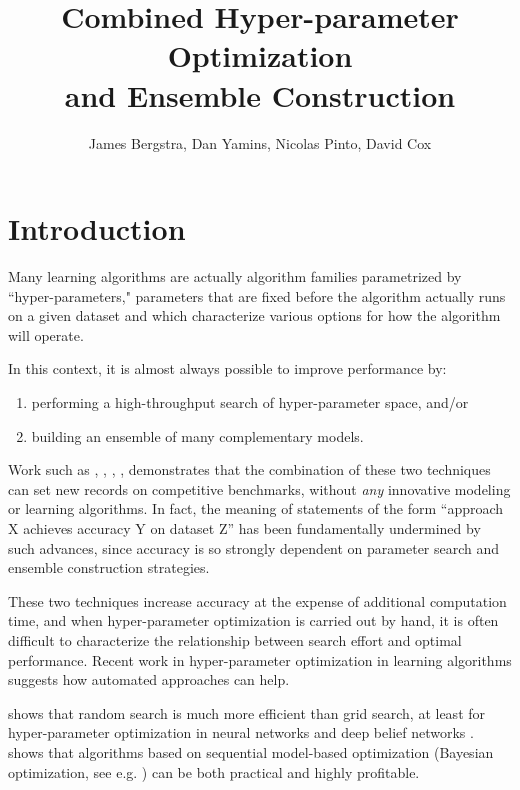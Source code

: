 \documentclass[11pt,twocolumn]{article}
\title{Combined Hyper-parameter Optimization\\and Ensemble Construction}
\author{James Bergstra, Dan Yamins, Nicolas Pinto, David Cox}
\begin{document}
\maketitle


\section{Introduction}

Many learning algorithms are actually algorithm families parametrized by 
``hyper-parameters,"  parameters that are fixed before the algorithm 
actually runs on a given dataset and which characterize various options for how
the algorithm will operate.

\vspace{11pt}
In this context, it is almost always possible to improve performance 
by:
\begin{enumerate}
 \item performing a high-throughput search of hyper-parameter space, and/or
 \item building an ensemble of many complementary models.
\end{enumerate}

\vspace{11pt}
Work such as
\cite{Pinto-2009}, \cite{pinto+cox:2011}, \cite{coates+lee+ng:2011},
\cite{gehler+nowozin:2009}, \cite{bergstra+bardenet+bengio+kegl:2011}
demonstrates that the combination of these two techniques can set new
records on competitive benchmarks, without \emph{any} innovative modeling or
learning algorithms.  In fact, the meaning of statements of the form
``approach X achieves accuracy Y on dataset Z'' has been fundamentally undermined by such
advances, since accuracy is so strongly dependent on parameter search and
ensemble construction strategies.

\vspace{11pt}
These two techniques increase accuracy at the expense of 
additional computation time, and when hyper-parameter 
optimization is carried out by hand, it is often
difficult to characterize the relationship between search 
effort and optimal performance.  Recent work in hyper-parameter
optimization in learning algorithms suggests how automated approaches
can help.

\vspace{11pt}
\cite{bergstra+bengio:2012} shows that random search is much more
efficient than grid search, at least for hyper-parameter optimization in
neural networks and deep belief networks
\cite{hinton+osindero+teh:2006}.
\cite{bergstra+bardenet+bengio+kegl:2011} shows that algorithms based on
sequential model-based optimization (Bayesian optimization,
see e.g. \cite{hutter:2009})
can be both practical and highly profitable.
\end{document}
